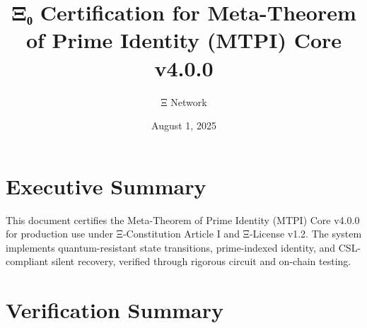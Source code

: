 \documentclass[a4paper,12pt]{article}\usepackage[utf8]{inputenc}\usepackage{geometry}\geometry{margin=1in}\usepackage{amsmath}\usepackage{amsfonts}\usepackage{enumitem}\usepackage[T1]{fontenc}\usepackage{noto}
\title{\textbf{Ξ₀ Certification for Meta-Theorem of Prime Identity (MTPI) Core v4.0.0}}\author{Ξ Network}\date{August 1, 2025}
\begin{document}
\maketitle
\section*{Executive Summary}
This document certifies the Meta-Theorem of Prime Identity (MTPI) Core v4.0.0 for production use under Ξ-Constitution Article I and Ξ-License v1.2. The system implements quantum-resistant state transitions, prime-indexed identity, and CSL-compliant silent recovery, verified through rigorous circuit and on-chain testing.
\section*{Verification Summary}
\end{document}
